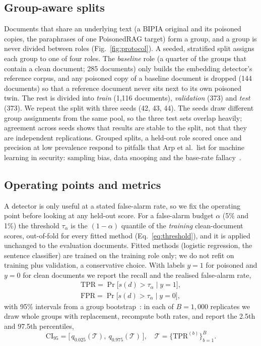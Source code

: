 \subsection{Group-aware splits}
Documents that share an underlying text (a BIPIA original and its poisoned
copies, the paraphrases of one PoisonedRAG target) form a group, and a group is
never divided between roles (Fig.~\ref{fig:protocol}). A seeded, stratified
split assigns each group to one of four roles. The \emph{baseline} role (a
quarter of the groups that contain a clean document; 285 documents) only builds
the embedding detector's reference corpus, and any poisoned copy of a baseline
document is dropped (144 documents) so that a reference document never sits next
to its own poisoned twin. The rest is divided into \emph{train} (1{,}116
documents), \emph{validation} (373) and \emph{test} (373). We repeat the split
with three seeds (42, 43, 44). The seeds draw different group assignments from
the same pool, so the three test sets overlap heavily; agreement across seeds
shows that results are stable to the split, not that they are independent
replications. Grouped splits, a held-out role scored once and precision at low
prevalence respond to pitfalls that Arp et al.\ list for machine learning in
security: sampling bias, data snooping and the base-rate fallacy~\cite{arp2022dos}.

\subsection{Operating points and metrics}
A detector is only useful at a stated false-alarm rate, so we fix the operating
point before looking at any held-out score. For a false-alarm budget $\alpha$
(5\% and 1\%) the threshold $\tau_\alpha$ is the $(1-\alpha)$ quantile of the
\emph{training} clean-document scores, out-of-fold for every fitted method
(Eq.~\ref{eq:threshold}), and it is applied unchanged to the evaluation
documents. Fitted methods (logistic regression, the sentence classifier) are
trained on the training role only; we do not refit on training plus validation,
a conservative choice. With labels $y=1$ for poisoned and $y=0$ for clean
documents we report the recall and the realised false-alarm rate,
\begin{equation}
    \begin{gathered}
    \mathrm{TPR}=\Pr\big[s(d)>\tau_\alpha\mid y=1\big],\\
    \mathrm{FPR}=\Pr\big[s(d)>\tau_\alpha\mid y=0\big],
    \end{gathered}
    \label{eq:tprfpr}
\end{equation}
with 95\% intervals from a group bootstrap~\cite{efron1979bootstrap}: in each of $B=1{,}000$ replicates we
draw whole groups with replacement, recompute both rates, and report the 2.5th
and 97.5th percentiles,
\begin{equation}
    \mathrm{CI}_{95}=\big[\,q_{0.025}(\mathcal{T}),\ q_{0.975}(\mathcal{T})\,\big],\quad
    \mathcal{T}=\{\mathrm{TPR}^{(b)}\}_{b=1}^{B}.
    \label{eq:bootstrap}
\end{equation}

